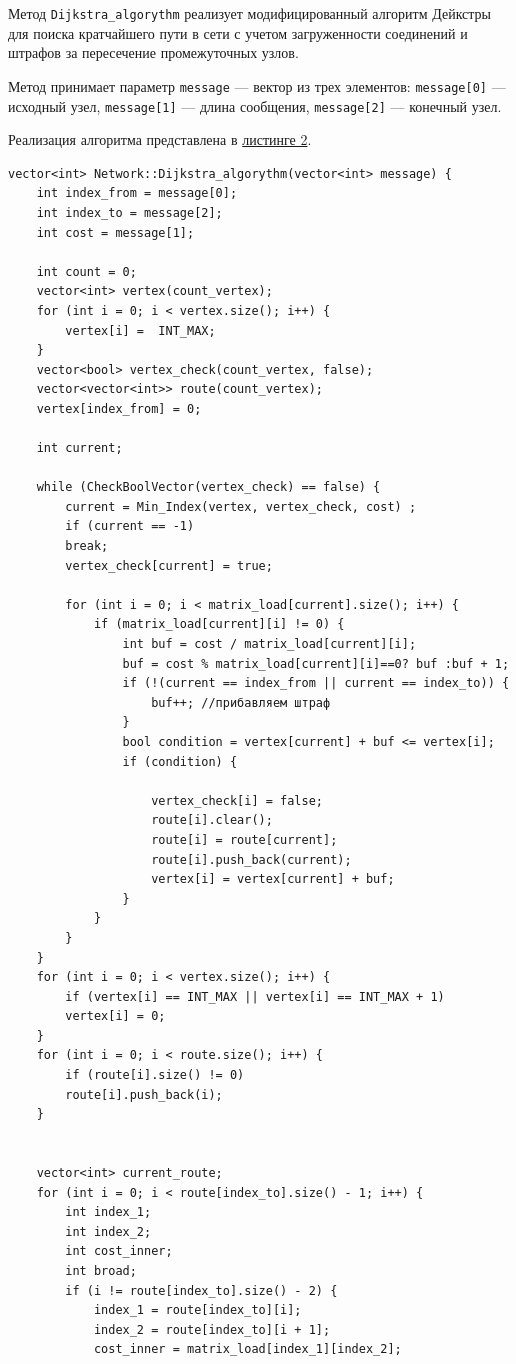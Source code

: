 \documentclass[11pt,a4paper,final]{article} %
\begin{document}
Метод \texttt{Dijkstra\_algorythm} реализует модифицированный алгоритм Дейкстры для поиска кратчайшего пути в сети с учетом загруженности соединений и штрафов за пересечение промежуточных узлов.

Метод принимает параметр \texttt{message} — вектор из трех элементов: \texttt{message[0]} — исходный узел, \texttt{message[1]} — длина сообщения, \texttt{message[2]} — конечный узел.

Реализация алгоритма представлена в \hyperref[lst2]{листинге 2}.

\begin{lstlisting}[label=lst2, caption = {Модифицированный алгоритм Дейкстры}]
vector<int> Network::Dijkstra_algorythm(vector<int> message) {
	int index_from = message[0];
	int index_to = message[2];
	int cost = message[1];
	
	int count = 0;
	vector<int> vertex(count_vertex);
	for (int i = 0; i < vertex.size(); i++) {
		vertex[i] =  INT_MAX;
	}
	vector<bool> vertex_check(count_vertex, false);
	vector<vector<int>> route(count_vertex);
	vertex[index_from] = 0;
	
	int current;
	
	while (CheckBoolVector(vertex_check) == false) {
		current = Min_Index(vertex, vertex_check, cost) ;
		if (current == -1)
		break;
		vertex_check[current] = true;
		
		for (int i = 0; i < matrix_load[current].size(); i++) {
			if (matrix_load[current][i] != 0) {
				int buf = cost / matrix_load[current][i];
				buf = cost % matrix_load[current][i]==0? buf :buf + 1;
				if (!(current == index_from || current == index_to)) {
					buf++; //прибавляем штраф
				}
				bool condition = vertex[current] + buf <= vertex[i];
				if (condition) {
					
					vertex_check[i] = false;
					route[i].clear();
					route[i] = route[current];
					route[i].push_back(current);
					vertex[i] = vertex[current] + buf;
				}
			}
		}
	}
	for (int i = 0; i < vertex.size(); i++) {
		if (vertex[i] == INT_MAX || vertex[i] == INT_MAX + 1)
		vertex[i] = 0;
	}
	for (int i = 0; i < route.size(); i++) {
		if (route[i].size() != 0)
		route[i].push_back(i);
	}
	
	
	vector<int> current_route;
	for (int i = 0; i < route[index_to].size() - 1; i++) {
		int index_1;
		int index_2;
		int cost_inner;
		int broad;
		if (i != route[index_to].size() - 2) {
			index_1 = route[index_to][i];
			index_2 = route[index_to][i + 1];
			cost_inner = matrix_load[index_1][index_2];
			

\end{lstlisting}
\end{document}
